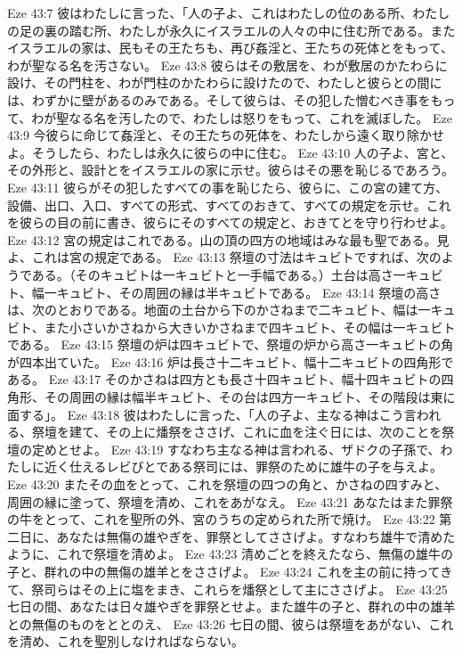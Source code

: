 Eze 43:7  彼はわたしに言った、「人の子よ、これはわたしの位のある所、わたしの足の裏の踏む所、わたしが永久にイスラエルの人々の中に住む所である。またイスラエルの家は、民もその王たちも、再び姦淫と、王たちの死体とをもって、わが聖なる名を汚さない。
Eze 43:8  彼らはその敷居を、わが敷居のかたわらに設け、その門柱を、わが門柱のかたわらに設けたので、わたしと彼らとの間には、わずかに壁があるのみである。そして彼らは、その犯した憎むべき事をもって、わが聖なる名を汚したので、わたしは怒りをもって、これを滅ぼした。
Eze 43:9  今彼らに命じて姦淫と、その王たちの死体を、わたしから遠く取り除かせよ。そうしたら、わたしは永久に彼らの中に住む。
Eze 43:10  人の子よ、宮と、その外形と、設計とをイスラエルの家に示せ。彼らはその悪を恥じるであろう。
Eze 43:11  彼らがその犯したすべての事を恥じたら、彼らに、この宮の建て方、設備、出口、入口、すべての形式、すべてのおきて、すべての規定を示せ。これを彼らの目の前に書き、彼らにそのすべての規定と、おきてとを守り行わせよ。
Eze 43:12  宮の規定はこれである。山の頂の四方の地域はみな最も聖である。見よ、これは宮の規定である。
Eze 43:13  祭壇の寸法はキュビトですれば、次のようである。（そのキュビトは一キュビトと一手幅である。）土台は高さ一キュビト、幅一キュビト、その周囲の縁は半キュビトである。
Eze 43:14  祭壇の高さは、次のとおりである。地面の土台から下のかさねまで二キュビト、幅は一キュビト、また小さいかさねから大きいかさねまで四キュビト、その幅は一キュビトである。
Eze 43:15  祭壇の炉は四キュビトで、祭壇の炉から高さ一キュビトの角が四本出ていた。
Eze 43:16  炉は長さ十二キュビト、幅十二キュビトの四角形である。
Eze 43:17  そのかさねは四方とも長さ十四キュビト、幅十四キュビトの四角形、その周囲の縁は幅半キュビト、その台は四方一キュビト、その階段は東に面する」。
Eze 43:18  彼はわたしに言った、「人の子よ、主なる神はこう言われる、祭壇を建て、その上に燔祭をささげ、これに血を注ぐ日には、次のことを祭壇の定めとせよ。
Eze 43:19  すなわち主なる神は言われる、ザドクの子孫で、わたしに近く仕えるレビびとである祭司には、罪祭のために雄牛の子を与えよ。
Eze 43:20  またその血をとって、これを祭壇の四つの角と、かさねの四すみと、周囲の縁に塗って、祭壇を清め、これをあがなえ。
Eze 43:21  あなたはまた罪祭の牛をとって、これを聖所の外、宮のうちの定められた所で焼け。
Eze 43:22  第二日に、あなたは無傷の雄やぎを、罪祭としてささげよ。すなわち雄牛で清めたように、これで祭壇を清めよ。
Eze 43:23  清めごとを終えたなら、無傷の雄牛の子と、群れの中の無傷の雄羊とをささげよ。
Eze 43:24  これを主の前に持ってきて、祭司らはその上に塩をまき、これらを燔祭として主にささげよ。
Eze 43:25  七日の間、あなたは日々雄やぎを罪祭とせよ。また雄牛の子と、群れの中の雄羊との無傷のものをととのえ、
Eze 43:26  七日の間、彼らは祭壇をあがない、これを清め、これを聖別しなければならない。
